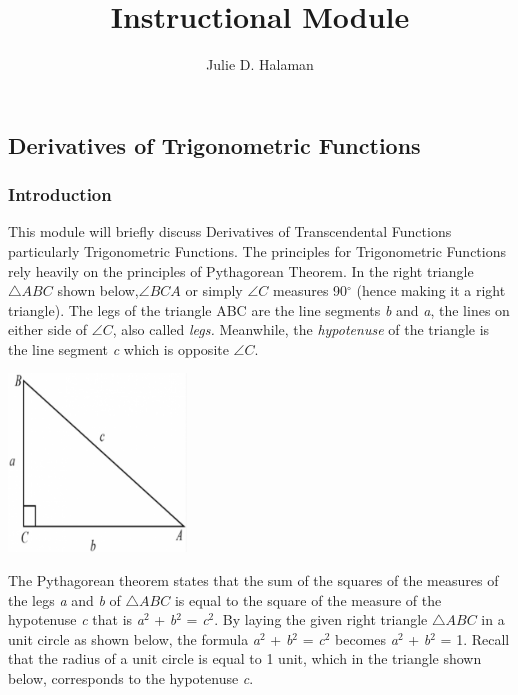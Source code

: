 \documentclass[
  letterpaper,
  DIV=11,
  numbers=noendperiod]{scrartcl}
\title{Instructional Module}
\author{Julie D. Halaman}
\date{}
\begin{document}
\maketitle

\subsection{Derivatives of Trigonometric
Functions}\label{derivatives-of-trigonometric-functions}

\subsubsection{Introduction}\label{introduction}

This module will briefly discuss Derivatives of Transcendental Functions
particularly Trigonometric Functions. The principles for Trigonometric
Functions rely heavily on the principles of Pythagorean Theorem. In the
right triangle \(\triangle ABC\) shown below,\(\angle BCA\) or simply
\(\angle C\) measures 90\(^{\circ}\) (hence making it a right triangle).
The legs of the triangle ABC are the line segments \emph{b} and
\emph{a}, the lines on either side of \(\angle C\), also called
\emph{legs.} Meanwhile, the \emph{hypotenuse} of the triangle is the
line segment \emph{c} which is opposite \(\angle C\).

\begin{center}
\includegraphics[width=1.86458in,height=\textheight]{IM-Halaman_files/mediabag/resize-1612330746441.png}
\end{center}

The Pythagorean theorem states that the sum of the squares of the
measures of the legs \emph{a} and \emph{b} of \(\triangle ABC\) is equal
to the square of the measure of the hypotenuse \emph{c} that is
\emph{a}\(^{2}\) + \emph{b}\(^{2}\) = \emph{c}\(^{2}\). By laying the
given right triangle \(\triangle ABC\) in a unit circle as shown below,
the formula \emph{a}\(^{2}\) + \emph{b}\(^{2}\) = \emph{c}\(^{2}\)
becomes \emph{a}\(^{2}\) + \emph{b}\(^{2}\) = 1. Recall that the radius
of a unit circle is equal to 1 unit, which in the triangle shown below,
corresponds to the hypotenuse \emph{c}.
\end{document}
